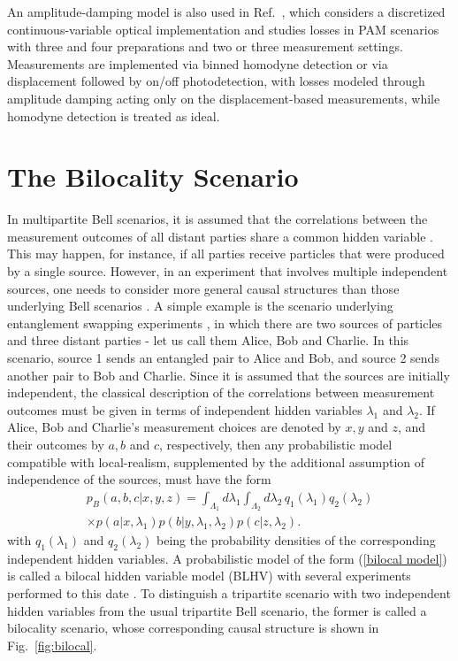 \documentclass[aps,pra,reprint, superscriptaddress,showkeys]{revtex4-2}
\theoremstyle{plain}
\begin{document}
An amplitude-damping model is also used in Ref.~\cite{alves2025}, which considers a discretized continuous-variable optical implementation and studies losses in PAM scenarios with three and four preparations and two or three measurement settings. Measurements are implemented via binned homodyne detection or via displacement followed by on/off photodetection, with losses modeled through amplitude damping acting only on the displacement-based measurements, while homodyne detection is treated as ideal.


\section{The Bilocality Scenario}
\label{sec:The Bilocality Scenario}


In multipartite Bell scenarios, it is assumed that the correlations between the measurement outcomes of all distant parties share a common hidden variable \cite{Chaves2017causalhierarchyof}. This may happen, for instance, if all parties receive particles that were produced by a single source. However, in an experiment that involves multiple independent sources, one needs to consider more general causal structures than those underlying Bell scenarios \cite{Tavakoli_2022, chaves2015unifying}. A simple example is the scenario underlying entanglement swapping experiments \cite{pan1998experimental}, in which there are two sources of particles and three distant parties  - let us call them Alice, Bob and Charlie. In this scenario, source 1 sends an entangled pair to Alice and Bob, and source 2 sends another pair to Bob and Charlie.
Since it is assumed that the sources are initially independent, the classical description of the correlations between measurement outcomes must be given in terms of independent hidden variables $\lambda_1$ and $\lambda_2$. If Alice, Bob and Charlie's measurement choices are denoted by $x,y$ and $z$, and their outcomes by $a,b$ and $c$, respectively, then any probabilistic model compatible with local-realism, supplemented by the additional assumption of independence of the sources, must have the form
\begin{multline}
    p_{B}(a,b,c|x,y,z) = \int_{\Lambda_1} d\lambda_1\int_{\Lambda_2} d\lambda_2\, q_1(\lambda_1)q_2(\lambda_2)\\\times p(a|x,\lambda_1)p(b|y,\lambda_1,\lambda_2)p(c|z,\lambda_2).
    \label{bilocal model}
\end{multline}
with $q_1(\lambda_1)$ and $q_2(\lambda_2)$ being the probability densities of the corresponding independent hidden variables. A probabilistic model of the form (\ref{bilocal model}) is called a bilocal hidden variable model (BLHV)\cite{branciardcharacterizing, branciardbilocal} with several experiments performed to this date \cite{carvacho2017experimental,saunders2017experimental,sun2019experimental,andreoli2017experimental}. To distinguish a tripartite scenario with two independent hidden variables from the usual tripartite Bell scenario, the former is called a bilocality scenario, whose corresponding causal structure is shown in Fig.~\ref{fig:bilocal}. 
\end{document}
